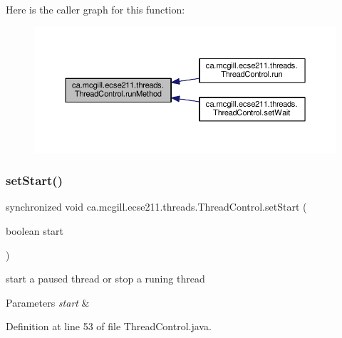 Here is the caller graph for this function\+:\nopagebreak
\begin{figure}[H]
\begin{center}
\leavevmode
\includegraphics[width=350pt]{classca_1_1mcgill_1_1ecse211_1_1threads_1_1_thread_control_a2959c54bdb6c62c9d5569cdf3ccf2418_icgraph}
\end{center}
\end{figure}
\mbox{\label{classca_1_1mcgill_1_1ecse211_1_1threads_1_1_thread_control_a16221cdc4ccf637b190934549c708e1f}} 
\subsubsection{\texorpdfstring{set\+Start()}{setStart()}}
{\footnotesize\ttfamily synchronized void ca.\+mcgill.\+ecse211.\+threads.\+Thread\+Control.\+set\+Start (\begin{DoxyParamCaption}\item[{boolean}]{start }\end{DoxyParamCaption})}

start a paused thread or stop a runing thread


\begin{DoxyParams}{Parameters}
{\em start} & \\
\hline
\end{DoxyParams}


Definition at line 53 of file Thread\+Control.\+java.


